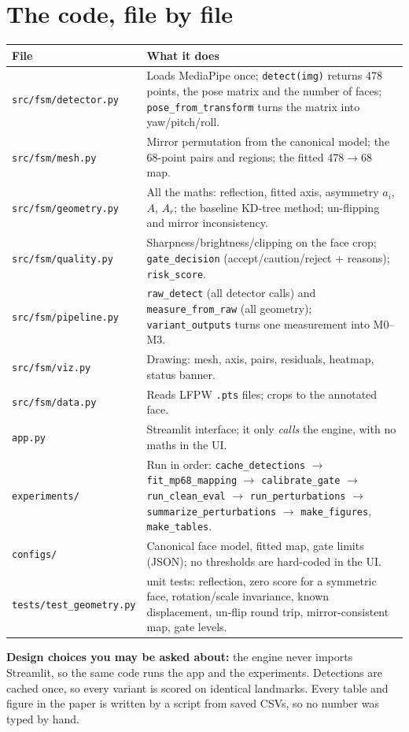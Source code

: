 \section{The code, file by file}
\begin{center}\small
\begin{tabular}{@{}p{4.4cm}>{\raggedright\arraybackslash}p{11cm}@{}}
\toprule
File & What it does\\
\midrule
\texttt{src/fsm/detector.py} & Loads MediaPipe once; \texttt{detect(img)} returns 478 points, the pose matrix and the number of faces; \texttt{pose\_from\_transform} turns the matrix into yaw/pitch/roll.\\
\texttt{src/fsm/mesh.py} & Mirror permutation from the canonical model; the 68-point pairs and regions; the fitted 478$\to$68 map.\\
\texttt{src/fsm/geometry.py} & All the maths: reflection, fitted axis, asymmetry $a_i$, $A$, $A_r$; the baseline KD-tree method; un-flipping and mirror inconsistency.\\
\texttt{src/fsm/quality.py} & Sharpness/brightness/clipping on the face crop; \texttt{gate\_decision} (accept/caution/reject + reasons); \texttt{risk\_score}.\\
\texttt{src/fsm/pipeline.py} & \texttt{raw\_detect} (all detector calls) and \texttt{measure\_from\_raw} (all geometry); \texttt{variant\_outputs} turns one measurement into M0--M3.\\
\texttt{src/fsm/viz.py} & Drawing: mesh, axis, pairs, residuals, heatmap, status banner.\\
\texttt{src/fsm/data.py} & Reads LFPW \texttt{.pts} files; crops to the annotated face.\\
\texttt{app.py} & Streamlit interface; it only \emph{calls} the engine, with no maths in the UI.\\
\texttt{experiments/} & Run in order: \texttt{cache\_detections} $\to$ \texttt{fit\_mp68\_mapping} $\to$ \texttt{calibrate\_gate} $\to$ \texttt{run\_clean\_eval} $\to$ \texttt{run\_perturbations} $\to$ \texttt{summarize\_perturbations} $\to$ \texttt{make\_figures}, \texttt{make\_tables}.\\
\texttt{configs/} & Canonical face model, fitted map, gate limits (JSON); no thresholds are hard-coded in the UI.\\
\texttt{tests/test\_geometry.py} & 15 unit tests: reflection, zero score for a symmetric face, rotation/scale invariance, known displacement, un-flip round trip, mirror-consistent map, gate levels.\\
\bottomrule
\end{tabular}
\end{center}
\textbf{Design choices you may be asked about:} the engine never imports Streamlit, so the
same code runs the app and the experiments. Detections are cached once, so every variant
is scored on identical landmarks. Every table and figure in the paper is written by a
script from saved CSVs, so no number was typed by hand.

